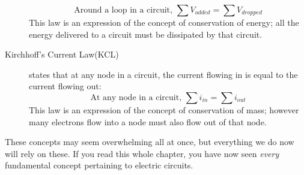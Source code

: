 \begin{description}
$$\textrm{Around a loop in a circuit,  }\sum{V_{added}} = \sum{V_{dropped}}$$
This law is an expression of the concept of conservation of energy; all the energy delivered to a circuit must be dissipated by that circuit.
\item[Kirchhoff's Current Law(KCL)] states that at any node in a circuit, the current flowing in is equal to the current flowing out:
$$\textrm{At any node in a circuit,  }\sum{i_{in}} = \sum{i_{out}}$$
This law is an expression of the concept of conservation of mass; however many electrons flow into a node must also flow out of that node.
\end{description}
\par
These concepts may seem overwhelming all at once, but everything we do now will rely on these. If you read this whole chapter, you have now seen \textit{every} fundamental concept pertaining to electric circuits.
